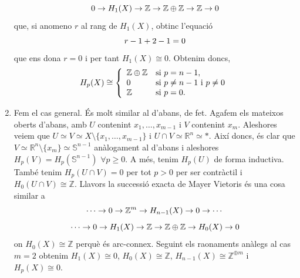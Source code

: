 \documentclass[../main.tex]{subfiles}
\begin{document}
\begin{sol}
\begin{enumerate}
    \begin{equation}
        \notag
        0\rightarrow H_1(X)\rightarrow \mathbb{Z}\rightarrow\mathbb{Z}\oplus\mathbb{Z}\rightarrow \mathbb{Z}\rightarrow 0
    \end{equation}
    que, si anomeno $r$ al rang de $H_1(X)$, obtinc l'equació
    \begin{equation}
        \notag
        r-1+2-1=0
    \end{equation}
    que ens dona $r = 0$ i per tant $H_1(X)\cong 0$. Obtenim doncs, 
    \begin{equation}
        \notag
        H_p(X)\cong\left\{
        \begin{array}{ll}
            \mathbb{Z}\oplus\mathbb{Z} & \text{si $p = n-1$}, \\
            0 & \text{si $p\not=n-1$ i $p\not=0$}\\
            \mathbb{Z} & \text{si $p=0$}.
        \end{array}
        \right.
    \end{equation}
    \item Fem el cas general. És molt similar al d'abans, de fet. Agafem els mateixos oberts d'abans, amb $U$ contenint $x_1,\ldots,x_{m-1}$ i $V$ contenint $x_m$. Aleshores veiem que $U\simeq V\simeq X\setminus\{x_1,\ldots,x_{m-1}\}$ i $U\cap V\simeq\mathbb{R}^n\simeq *$. Així doncs, és clar que $V\simeq \mathbb{R}^n\setminus\{x_m\}\simeq \mathbb{S}^{n-1}$ anàlogament al d'abans i aleshores $H_p(V)=H_p(\mathbb{S}^{n-1})$ $\forall p\geq 0$. A més, tenim $H_p(U)$ de forma inductiva. També tenim $H_p(U\cap V) = 0$ per tot $p>0$ per ser contràctil i $H_0(U\cap V)\cong\mathbb{Z}$. Llavors la successió exacta de Mayer Vietoris és una cosa similar a
    \begin{equation}
        \notag
        \cdots\rightarrow 0\rightarrow\mathbb{Z}^m\rightarrow H_{n-1}(X)\rightarrow 0\rightarrow\cdots
    \end{equation}
    \begin{equation}
        \notag
        \cdots\rightarrow 0\rightarrow H_1(X)\rightarrow \mathbb{Z}\rightarrow \mathbb{Z}\oplus\mathbb{Z}\rightarrow H_0(X)\rightarrow 0
    \end{equation}
    on $H_0(X)\cong\mathbb{Z}$ perquè és arc-connex. Seguint els raonaments anàlegs al cas $m = 2$ obtenim $H_1(X) \cong 0$, $H_0(X)\cong\mathbb{Z}$, $H_{n-1}(X)\cong\mathbb{Z}^{\oplus m}$ i $H_p(X)\cong 0$.
\end{enumerate}
\end{sol}
\end{document}
